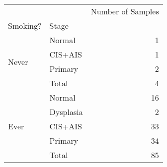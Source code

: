 \begin{tabular}{l|lr}
\toprule
     &       & Number of Samples \\
Smoking? & Stage &                   \\
\midrule
\multirow{4}{*}{Never} & Normal &                 1 \\
     & CIS+AIS &                 1 \\
     & Primary &                 2 \\
     & Total &                 4 \\
\cline{1-3}
\multirow{5}{*}{Ever} & Normal &                16 \\
     & Dysplasia &                 2 \\
     & CIS+AIS &                33 \\
     & Primary &                34 \\
     & Total &                85 \\
\bottomrule
\end{tabular}
